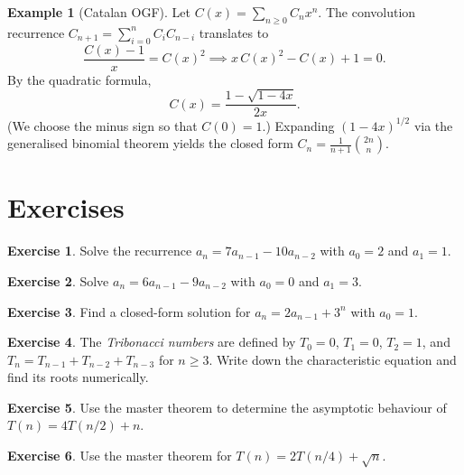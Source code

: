 \documentclass[12pt,a4paper,openany]{book}
\theoremstyle{definition}
\newtheorem{example}[definition]{Example}
\newtheorem{exercise}{Exercise}[chapter]
\theoremstyle{plain}
\theoremstyle{remark}
\begin{document}
\begin{example}[Catalan OGF]\label{ex:catalan-gf}
Let $C(x) = \sum_{n \ge 0} C_n x^n$.  The convolution recurrence
$C_{n+1} = \sum_{i=0}^{n} C_i C_{n-i}$ translates to
\[
   \frac{C(x) - 1}{x} = C(x)^2
   \implies x\, C(x)^2 - C(x) + 1 = 0.
\]
By the quadratic formula,
\[
   C(x) = \frac{1 - \sqrt{1 - 4x}}{2x}.
\]
(We choose the minus sign so that $C(0) = 1$.)  Expanding $(1-4x)^{1/2}$
via the generalised binomial theorem yields the closed form
$C_n = \frac{1}{n+1}\binom{2n}{n}$.
\end{example}

\section{Exercises}\label{sec:rec-exercises}

\begin{exercise}\label{exo:rec1}
Solve the recurrence $a_n = 7a_{n-1} - 10a_{n-2}$ with $a_0 = 2$ and
$a_1 = 1$.
\end{exercise}

\begin{exercise}\label{exo:rec2}
Solve $a_n = 6a_{n-1} - 9a_{n-2}$ with $a_0 = 0$ and $a_1 = 3$.
\end{exercise}

\begin{exercise}\label{exo:rec3}
Find a closed-form solution for $a_n = 2a_{n-1} + 3^n$ with $a_0 = 1$.
\end{exercise}

\begin{exercise}\label{exo:rec4}
The \emph{Tribonacci numbers} are defined by $T_0 = 0$, $T_1 = 0$,
$T_2 = 1$, and $T_n = T_{n-1} + T_{n-2} + T_{n-3}$ for $n \ge 3$.
Write down the characteristic equation and find its roots numerically.
\end{exercise}

\begin{exercise}\label{exo:rec5}
Use the master theorem to determine the asymptotic behaviour of
$T(n) = 4T(n/2) + n$.
\end{exercise}

\begin{exercise}\label{exo:rec6}
Use the master theorem for $T(n) = 2T(n/4) + \sqrt{n}$.
\end{exercise}
\end{document}

